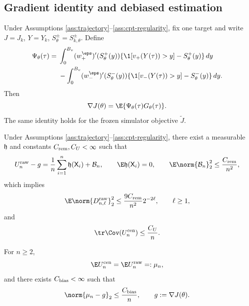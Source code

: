 \subsection{Gradient identity and debiased estimation}

\begin{theorem}\label{thm:gradient-identity}
Under Assumptions \ref{ass:trajectory}--\ref{ass:cpt-regularity}, fix one target and write $J=J_k$, $Y=Y_k$, $S_\theta^\pm=S_{k,\theta}^\pm$.  Define
\begin{align}\label{eq:cpt-multiplier}
 \Psi_\theta(\tau)
 ={}&\int_0^{B_v}(w_+^\eps)'(S_\theta^+(y))
 \{\1[v_+(Y(\tau))>y]-S_\theta^+(y)\}\,dy\notag\\
 &-\int_0^{B_v}(w_-^\eps)'(S_\theta^-(y))
 \{\1[v_-(Y(\tau))>y]-S_\theta^-(y)\}\,dy.
\end{align}
Then
\begin{equation}\label{eq:score-gradient-identity}
 \nabla J(\theta)=\E\{\Psi_\theta(\tau)G_\theta(\tau)\}.
\end{equation}
The same identity holds for the frozen simulator objective $\widetilde J$.
\end{theorem}

\begin{lemma}\label{lem:level-cancellation}
Under Assumptions \ref{ass:trajectory}--\ref{ass:cpt-regularity}, there exist a measurable $\mathfrak h$ and constants $C_{\rm rem},C_U<\infty$ such that
\begin{equation}\label{eq:loo-expansion}
 U_n^{\rm raw}-g
 =\frac1n\sum_{i=1}^{n}\mathfrak h(\mathsf X_i)+\mathcal B_n,
 \qquad
 \E\mathfrak h(\mathsf X_i)=0,
 \qquad
 \E\norm{\mathcal B_n}_2^2\le\frac{C_{\rm rem}}{n^2},
\end{equation}
which implies
\begin{equation}\label{eq:level-second-moment}
 \E\norm{D_{n,\ell}^{\rm raw}}_2^2
 \le\frac{9C_{\rm rem}}{n^2}2^{-2\ell},
 \qquad \ell\ge1,
\end{equation}
and
\begin{equation}\label{eq:centered-loo-variance}
 \tr\Cov(U_n^{\rm cen})\le\frac{C_U}{n}.
\end{equation}
\end{lemma}


\begin{lemma}\label{lem:centering-expectation}
For $n\ge2$,
\begin{equation}\label{eq:centered-raw-mean}
 \E U_n^{\rm cen}=\E U_n^{\rm raw}=: \mu_n,
\end{equation}
and there exists $C_{\rm bias}<\infty$ such that
\begin{equation}\label{eq:loo-bias-order}
 \norm{\mu_n-g}_2\le \frac{C_{\rm bias}}{n},
 \qquad g:=\nabla J(\theta).
\end{equation}
\end{lemma}

